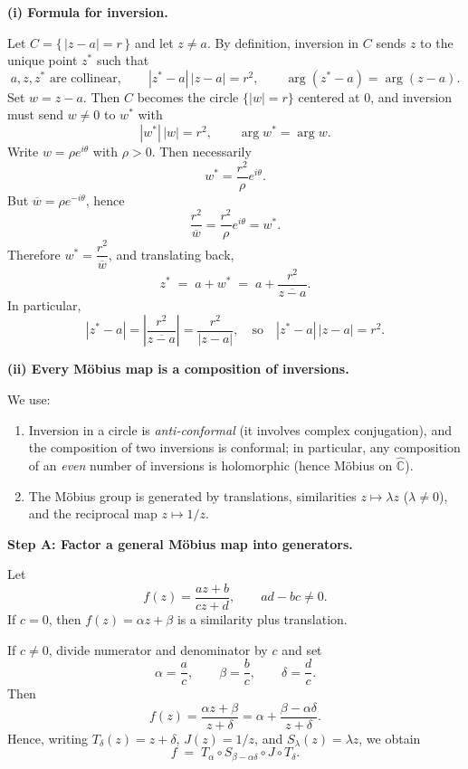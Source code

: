 \begin{solution}

\par\medskip\noindent\textbf{\textbf{(i) Formula for inversion.}}\par\smallskip

Let $C=\{\,|z-a|=r\,\}$ and let $z\neq a$. By definition, inversion in $C$ sends $z$ to the unique point $z^{*}$ such that
\[
a,z,z^{*} \text{ are collinear},\qquad |z^{*}-a|\,|z-a|=r^2,
\qquad \arg(z^{*}-a)=\arg(z-a).
\]
Set $w=z-a$. Then $C$ becomes the circle $\{|w|=r\}$ centered at $0$, and inversion must send $w\neq 0$ to $w^{*}$ with
\[
|w^{*}|\,|w|=r^2,\qquad \arg w^{*}=\arg w.
\]
Write $w=\rho e^{i\theta}$ with $\rho>0$. Then necessarily
\[
w^{*}=\frac{r^2}{\rho}e^{i\theta}.
\]
But $\overline{w}=\rho e^{-i\theta}$, hence
\[
\frac{r^2}{\overline{w}}=\frac{r^2}{\rho}e^{i\theta}=w^{*}.
\]
Therefore $w^{*}=\dfrac{r^2}{\overline{w}}$, and translating back,
\[
z^{*} \;=\; a+w^{*} \;=\; a+\frac{r^2}{\overline{z-a}}.
\]
In particular,
\[
|z^{*}-a|=\left|\frac{r^2}{\overline{z-a}}\right|=\frac{r^2}{|z-a|},
\quad\text{so}\quad
|z^{*}-a|\,|z-a|=r^2.
\]

\par\medskip\noindent\textbf{\textbf{(ii) Every M\"{o}bius map is a composition of inversions.}}\par\smallskip

We use:
\begin{enumerate}
	\item Inversion in a circle is \emph{anti-conformal} (it involves complex conjugation), and the composition of two inversions is conformal; in particular, any composition of an \emph{even} number of inversions is holomorphic (hence M\"{o}bius on $\widehat{\mathbb C}$).
	\item The M\"{o}bius group is generated by translations, similarities $z\mapsto \lambda z$ ($\lambda\neq 0$), and the reciprocal map $z\mapsto 1/z$.
\end{enumerate}

\par\medskip\noindent\textbf{\textbf{Step A: Factor a general M\"{o}bius map into generators.}}\par\smallskip

Let
\[
f(z)=\frac{az+b}{cz+d},\qquad ad-bc\neq 0.
\]
If $c=0$, then $f(z)=\alpha z+\beta$ is a similarity plus translation.

If $c\neq 0$, divide numerator and denominator by $c$ and set
\[
\alpha=\frac ac,\qquad \beta=\frac bc,\qquad \delta=\frac dc.
\]
Then
\[
f(z)=\frac{\alpha z+\beta}{z+\delta}
=\alpha+\frac{\beta-\alpha\delta}{z+\delta}.
\]
Hence, writing $T_\delta(z)=z+\delta$, $J(z)=1/z$, and $S_\lambda(z)=\lambda z$, we obtain
\[
f \;=\; T_\alpha \circ S_{\beta-\alpha\delta}\circ J \circ T_\delta.
\]


\end{solution}
